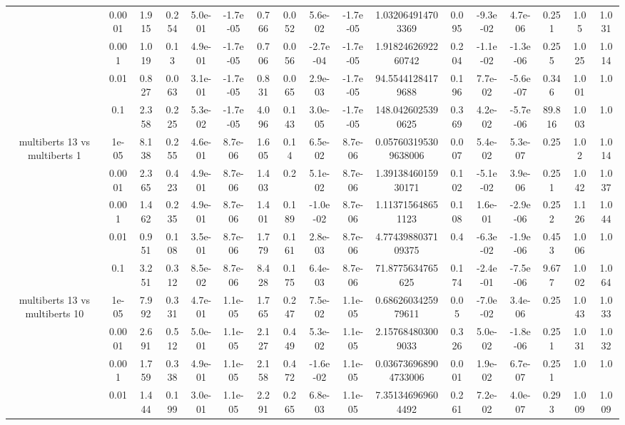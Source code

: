 \begin{tabular}{|c|c|c|c|c|c|c|c|c|c|c|c|c|c|c|c|c|}
 & 0.0001 & 1.915 & 0.254 & 5.0e-01 & -1.7e-05 & 0.766 & 0.052 & 5.6e-02 & -1.7e-05 & 1.032064914703369 & 0.095 & -9.3e-02 & 4.7e-06 & 0.251 & 1.05 & 1.031 \\
 & 0.001 & 1.019 & 0.13 & 4.9e-01 & -1.7e-05 & 0.706 & 0.056 & -2.7e-04 & -1.7e-05 & 1.9182462692260742 & 0.204 & -1.1e-02 & -1.3e-06 & 0.255 & 1.025 & 1.014 \\
 & 0.01 & 0.827 & 0.063 & 3.1e-01 & -1.7e-05 & 0.831 & 0.065 & 2.9e-03 & -1.7e-05 & 94.55441284179688 & 0.196 & 7.7e-02 & -5.6e-07 & 0.346 & 1.001 & 1.0 \\
 & 0.1 & 2.358 & 0.225 & 5.3e-02 & -1.7e-05 & 4.096 & 0.143 & 3.0e-05 & -1.7e-05 & 148.0426025390625 & 0.369 & 4.2e-02 & -5.7e-06 & 89.816 & 1.003 & 1.0 \\
\hline
\multirow{5}{*}{multiberts 13 vs multiberts 1} & 1e-05 & 8.138 & 0.255 & 4.6e-01 & 8.7e-06 & 1.605 & 0.14 & 6.5e-02 & 8.7e-06 & 0.057603195309638006 & 0.007 & 5.4e-02 & 5.3e-07 & 0.25 & 1.02 & 1.014 \\
 & 0.0001 & 2.365 & 0.423 & 4.9e-01 & 8.7e-06 & 1.403 & 0.2 & 5.1e-02 & 8.7e-06 & 1.3913846015930171 & 0.102 & -5.1e-02 & 3.9e-06 & 0.251 & 1.042 & 1.037 \\
 & 0.001 & 1.462 & 0.235 & 4.9e-01 & 8.7e-06 & 1.401 & 0.189 & -1.0e-02 & 8.7e-06 & 1.113715648651123 & 0.108 & 1.6e-01 & -2.9e-06 & 0.252 & 1.126 & 1.044 \\
 & 0.01 & 0.951 & 0.108 & 3.5e-01 & 8.7e-06 & 1.779 & 0.161 & 2.8e-03 & 8.7e-06 & 4.7743988037109375 & 0.4 & -6.3e-02 & -1.9e-06 & 0.453 & 1.006 & 1.0 \\
 & 0.1 & 3.251 & 0.312 & 8.5e-02 & 8.7e-06 & 8.428 & 0.175 & 6.4e-03 & 8.7e-06 & 71.8775634765625 & 0.174 & -2.4e-01 & -7.5e-06 & 9.677 & 1.002 & 1.064 \\
\hline
\multirow{5}{*}{multiberts 13 vs multiberts 10} & 1e-05 & 7.992 & 0.331 & 4.7e-01 & 1.1e-05 & 1.765 & 0.247 & 7.5e-02 & 1.1e-05 & 0.6862603425979611 & 0.05 & -7.0e-02 & 3.4e-06 & 0.25 & 1.043 & 1.033 \\
 & 0.0001 & 2.691 & 0.512 & 5.0e-01 & 1.1e-05 & 2.127 & 0.449 & 5.3e-02 & 1.1e-05 & 2.157684803009033 & 0.326 & 5.0e-02 & -1.8e-06 & 0.251 & 1.031 & 1.032 \\
 & 0.001 & 1.759 & 0.338 & 4.9e-01 & 1.1e-05 & 2.158 & 0.472 & -1.6e-02 & 1.1e-05 & 0.036736968904733006 & 0.001 & 1.9e-02 & 6.7e-07 & 0.251 & 1.0 & 1.0 \\
 & 0.01 & 1.444 & 0.199 & 3.0e-01 & 1.1e-05 & 2.291 & 0.265 & 6.8e-03 & 1.1e-05 & 7.351346969604492 & 0.261 & 7.2e-02 & 4.0e-07 & 0.293 & 1.009 & 1.009 \\

\end{tabular}

